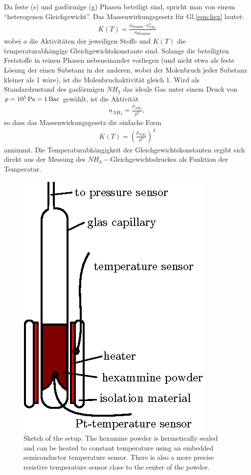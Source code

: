 \documentclass[english,twocolumn,DIV21,a4,10pt]{scrartcl}
\begin{document}
Da feste (s) und gasförmige (g) Phasen beteiligt sind, spricht man von
einem ``heterogenen Gleichgewicht''.  Das Massenwirkungsgesetz für
Gl.\eqref{eqn:hex} lautet:
\begin{align}
  K(T) = \frac{a_\textrm{Diamin} \cdot a^4_{NH_3}}{a_\textrm{Hexamin}}
\end{align}
wobei $a$ die  Aktivit\"aten der
jeweiligen Stoffe und $K(T)$ die temperaturabhängige
Gleichgewichtskonstante sind. Solange die beteiligten Feststoffe in
reinen Phasen nebeneinander vorliegen (und nicht etwa als feste
L\"osung der einen Substanz in der anderen, wobei der Molenbruch jeder
Substanz kleiner als 1 w\"are), ist die Molenbruchaktivit\"at gleich
1.  Wird als Standardzustand des gasförmigen $NH_3$ das ideale Gas
unter einem Druck von $p = \unit[10^5]{Pa} = \unit[1]{Bar}$ gewählt,
ist die Aktivit\"at
\begin{align}
  a_{NH_3}=\frac{p_{NH_3}}{p^\theta},
\end{align}
so dass das Massenwirkungsgesetz die einfache Form
\begin{align}
  K(T)=\left(\frac{p_{NH_3}}{p^\theta}\right)^4
\end{align}
annimmt. Die Temperaturabhängigkeit der Gleichgewichtskonstanten
ergibt sich direkt aus der Messung des $NH_3-$Gleichgewichtsdruckes
als Funktion der Temperatur.

\begin{figure}
  \centering
  \includegraphics{kapillare.eps}
  \caption{Sketch of the setup. The hexamine powder is hermetically
    sealed and can be heated to constant temperature using an embedded
    semiconductor temperature sensor. There is also a more precise
    resistive temperature sensor close to the center of the powder.}
   \label{fig:kapillare}
 \end{figure}
\end{document}
